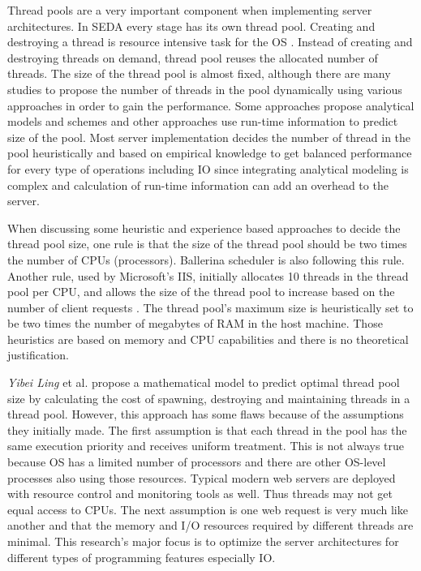 Thread pools are a very important component when implementing server architectures. In SEDA every stage has its own thread pool. Creating and destroying a thread is resource intensive task for the OS \cite{thread_pool_analysis}. Instead of creating and destroying threads on demand, thread pool reuses the allocated number of threads. The size of the thread pool is almost fixed, although there are many studies to propose the number of threads in the pool dynamically using various approaches in order to gain the performance. Some approaches propose analytical models and schemes \cite{xu2004performance,thread_pool_analysis,math_aproach_thread_pool_tuning,syer2011identifying,linfeng2017design} and other approaches use run-time information \cite{lorenzon2016investigating,nieplocha2007evaluating,agrawal2006adaptive} to predict size of the pool. Most server implementation decides the number of thread in the pool heuristically and based on empirical knowledge \cite{thread_pool_analysis,math_aproach_thread_pool_tuning} to get balanced performance for every type of operations including IO since integrating analytical modeling is complex and calculation of run-time information can add an overhead to the server.

When discussing some heuristic and experience based approaches to decide the thread pool size, one rule is that the size of the thread pool should be two times the number of CPUs (processors). Ballerina scheduler is also following this rule. Another rule, used by Microsoft's IIS, initially allocates 10 threads in the thread pool per CPU, and allows the size of the thread pool to increase based on the number of client requests \cite{thread_pool_analysis}. The thread pool's maximum size is heuristically set to be two times the number of megabytes of RAM in the host machine. Those heuristics are based on memory and CPU capabilities and there is no theoretical justification.

\textit{Yibei Ling} et al. \cite{thread_pool_analysis} propose a mathematical model to predict optimal thread pool size by calculating the cost of spawning, destroying and maintaining threads in a thread pool. However, this approach has some flaws because of the assumptions they initially made. The first assumption is that each thread in the pool has the same execution priority and receives uniform treatment. This is not always true because OS has a limited number of processors and there are other OS-level processes also using those resources. Typical modern web servers are deployed with resource control and monitoring tools as well. Thus threads may not get equal access to CPUs. The next assumption is one web request is very much like another and that the memory and I/O resources required by different threads are minimal. This research's major focus is to optimize the server architectures for different types of programming features especially IO. 

